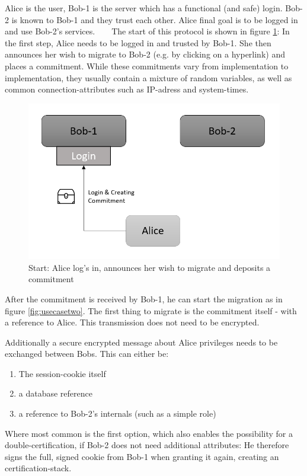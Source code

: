 Alice is the user, Bob-1 is the server which has a functional (and safe) login. Bob-2 is known to Bob-1 and they trust each other. Alice final goal is to be logged in and use Bob-2's services. 
~\newline
~\newline  
The start of this protocol is shown in figure \ref{fig:usecaseone}: In the first step, Alice needs to be logged in and trusted by Bob-1. She then announces her wish to migrate to Bob-2 (e.g. by clicking on a hyperlink) and places a commitment. While these commitments vary from implementation to implementation, they usually contain a mixture of random variables, as well as common connection-attributes such as IP-adress and system-times.   
\begin{figure} [h]
	\centering
	\includegraphics[width=0.6\linewidth]{Images/UseCaseOne}
	\caption[Protocol Start]{Start: Alice log's in, announces her wish to migrate and deposits a commitment}
	\label{fig:usecaseone}
\end{figure}
After the commitment is received by Bob-1, he can start the migration as in figure \ref{fig:usecasetwo}. The first thing to migrate is the commitment itself - with a reference to Alice. This transmission does not need to be encrypted.  

Additionally a secure encrypted message about Alice privileges needs to be exchanged between Bobs. This can either be: 
\begin{enumerate}
	\item The session-cookie itself 
	\item a database reference
	\item a reference to Bob-2's internals (such as a simple role)
\end{enumerate}
Where most common is the first option, which also enables the possibility for a double-certification, if Bob-2 does not need additional attributes: He therefore signs the full, signed cookie from Bob-1 when granting it again, creating an certification-stack. 

